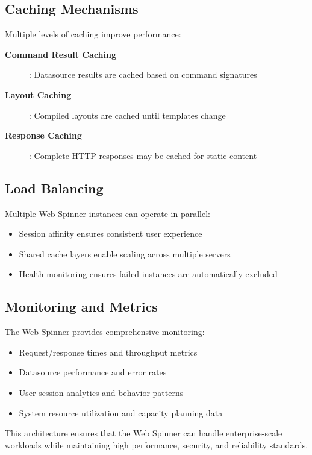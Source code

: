 \subsection{Caching Mechanisms}

Multiple levels of caching improve performance:

\begin{description}
	\item[\textbf{Command Result Caching}]: Datasource results are cached based on command signatures
	\item[\textbf{Layout Caching}]: Compiled layouts are cached until templates change
	\item[\textbf{Response Caching}]: Complete HTTP responses may be cached for static content
\end{description}

\subsection{Load Balancing}

Multiple Web Spinner instances can operate in parallel:
\begin{itemize}
	\item Session affinity ensures consistent user experience
	\item Shared cache layers enable scaling across multiple servers
	\item Health monitoring ensures failed instances are automatically excluded
\end{itemize}

\subsection{Monitoring and Metrics}

The Web Spinner provides comprehensive monitoring:
\begin{itemize}
	\item Request/response times and throughput metrics
	\item Datasource performance and error rates
	\item User session analytics and behavior patterns
	\item System resource utilization and capacity planning data
\end{itemize}

This architecture ensures that the Web Spinner can handle enterprise-scale workloads while maintaining high performance, security, and reliability standards.

